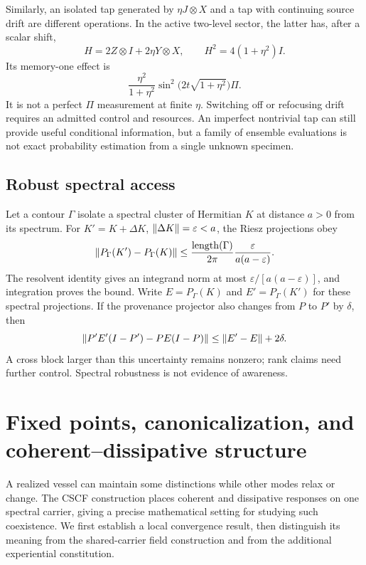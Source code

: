 Similarly, an isolated tap generated by $\eta J\otimes X$ and a tap with continuing source drift are different operations. In the active two-level sector, the latter has, after a scalar shift,
\[
H=2Z\otimes I+2\eta Y\otimes X,
\qquad H^2=4(1+\eta^2)I.
\]
Its memory-one effect is
\[
\frac{\eta^2}{1+\eta^2}
\sin^2\bigl(2t\sqrt{1+\eta^2}\bigr)\Pi.
\]
It is not a perfect $\Pi$ measurement at finite $\eta$. Switching off or refocusing drift requires an admitted control and resources. An imperfect nontrivial tap can still provide useful conditional information, but a family of ensemble evaluations is not exact probability estimation from a single unknown specimen.

\section{Robust spectral access}\label{section:o1:robust-spectral-access}
Let a contour $\Gamma$ isolate a spectral cluster of Hermitian $K$ at distance $a>0$ from its spectrum. For $K'=K+\Delta K$, $\lVert \Delta K\rVert=\varepsilon<a$, the Riesz projections obey
\begin{equation}\label{eq:resolventbound}
\lVert P_\Gamma(K')-P_\Gamma(K)\rVert
\le\frac{\operatorname{length}(\Gamma)}{2\pi}
\frac{\varepsilon}{a(a-\varepsilon)}.
\end{equation}
The resolvent identity gives an integrand norm at most $\varepsilon/[a(a-\varepsilon)]$, and integration proves the bound. Write $E=P_\Gamma(K)$ and $E'=P_\Gamma(K')$ for these spectral projections. If the provenance projector also changes from $P$ to $P'$ by $\delta$, then
\[
\lVert P'E'(I-P')-PE(I-P)\rVert\le\lVert E'-E\rVert+2\delta.
\]
A cross block larger than this uncertainty remains nonzero; rank claims need further control. Spectral robustness is not evidence of awareness.

\chapter{Fixed points, canonicalization, and coherent--dissipative structure}\label{ch:cscf}
A realized vessel can maintain some distinctions while other modes relax or change. The CSCF construction places coherent and dissipative responses on one spectral carrier, giving a precise mathematical setting for studying such coexistence. We first establish a local convergence result, then distinguish its meaning from the shared-carrier field construction and from the additional experiential constitution.

